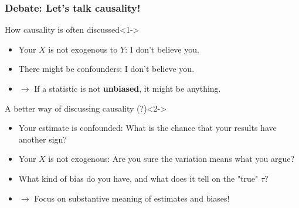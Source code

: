 \documentclass[12pt,aspectratio=169]{beamer}\usepackage[]{graphicx}\usepackage[]{xcolor}
\begin{document}
\begin{frame}
\frametitle{Debate: Let's talk causality!}

    \begin{alertblock}{How causality is often discussed}<1->

    \begin{itemize}[itemsep=0em, topsep=0pt]
    \small
        \item Your $X$ is not exogenous to $Y$: I don't believe you.
        \item There might be confounders: I don't believe you.
        \item $\rightarrow$ If a statistic is not \textbf{unbiased}, it might be anything.
    \end{itemize}

    \end{alertblock}

    \begin{alertblock}{A better way of discussing causality (?)}<2->

    \begin{itemize}[itemsep=0em, topsep=0pt]
    \small
        \item Your estimate is confounded: What is the chance that your results have another sign?
        \item Your $X$ is not exogenous: Are you sure the variation means what you argue?
        \item What kind of bias do you have, and what does it tell on the "true" $\tau$?
        \item $\rightarrow$ Focus on substantive meaning of estimates and biases!
    \end{itemize}

    \end{alertblock}

\end{frame}
\end{document}
